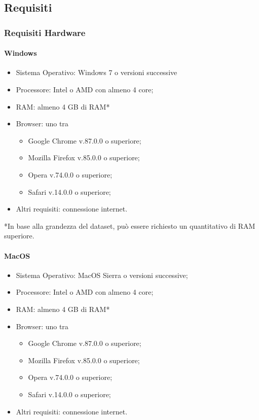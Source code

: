 \documentclass[../manuale_sviluppatore.tex]{subfiles}
\begin{document}
\subsection{Requisiti}
    \label{sec:requisiti}
\subsubsection{Requisiti Hardware}
    \label{subsub:req_h}

\paragraph{Windows}
    \label{par:Windows_req}

\begin{itemize}
    \item Sistema Operativo: Windows 7 o versioni successive
    \item Processore: Intel o AMD con almeno 4 core;
    \item RAM: almeno 4 GB di RAM*
    \item Browser: uno tra \begin{itemize}
        \vspace{-5pt}
        \item Google Chrome v.87.0.0 o superiore;
        \item Mozilla Firefox v.85.0.0 o superiore;
        \item Opera v.74.0.0 o superiore;
        \item Safari v.14.0.0 o superiore;
    \end{itemize}
    \item Altri requisiti: connessione internet.
\end{itemize}

*In base alla grandezza del dataset, può essere richiesto un quantitativo di RAM superiore.

\paragraph{MacOS}
    \label{par:mac_req}

\begin{itemize}
    \item Sistema Operativo: MacOS Sierra o versioni successive;
    \item Processore: Intel o AMD con almeno 4 core;
    \item RAM: almeno 4 GB di RAM*
    \item Browser: uno tra \begin{itemize}
        \vspace{-5pt}
        \item Google Chrome v.87.0.0 o superiore;
        \item Mozilla Firefox v.85.0.0 o superiore;
        \item Opera v.74.0.0 o superiore;
        \item Safari v.14.0.0 o superiore;
    \end{itemize}
    \item Altri requisiti: connessione internet.
\end{itemize}
\end{document}
